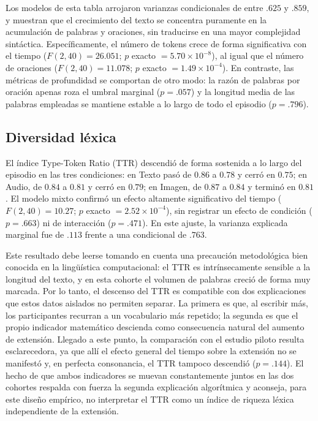 \documentclass[12pt]{article}
\begin{document}
	Los modelos de esta tabla arrojaron varianzas condicionales de entre $.625$ y $.859$, y muestran que el crecimiento del texto se concentra puramente en la acumulación de palabras y oraciones, sin traducirse en una mayor complejidad sintáctica. Específicamente, el número de tokens crece de forma significativa con el tiempo ($F(2,40) = 26.051$; $p$ exacto $= 5.70 \times 10^{-8}$), al igual que el número de oraciones ($F(2,40) = 11.078$; $p$ exacto $= 1.49 \times 10^{-4}$). En contraste, las métricas de profundidad se comportan de otro modo: la razón de palabras por oración apenas roza el umbral marginal ($p = .057$) y la longitud media de las palabras empleadas se mantiene estable a lo largo de todo el episodio ($p = .796$). 
	
	\subsection{Diversidad léxica} 
	
	El índice Type-Token Ratio (TTR) descendió de forma sostenida a lo largo del episodio en las tres condiciones: en Texto pasó de $0.86$ a $0.78$ y cerró en $0.75$; en Audio, de $0.84$ a $0.81$ y cerró en $0.79$; en Imagen, de $0.87$ a $0.84$ y terminó en $0.81$. El modelo mixto confirmó un efecto altamente significativo del tiempo ($F(2,40) = 10.27$; $p$ exacto $= 2.52 \times 10^{-4}$), sin registrar un efecto de condición ($p = .663$) ni de interacción ($p = .471$). En este ajuste, la varianza explicada marginal fue de $.113$ frente a una condicional de $.763$. 
	
	Este resultado debe leerse tomando en cuenta una precaución metodológica bien conocida en la lingüística computacional: el TTR es intrínsecamente sensible a la longitud del texto, y en esta cohorte el volumen de palabras creció de forma muy marcada. Por lo tanto, el descenso del TTR es compatible con dos explicaciones que estos datos aislados no permiten separar. La primera es que, al escribir más, los participantes recurran a un vocabulario más repetido; la segunda es que el propio indicador matemático descienda como consecuencia natural del aumento de extensión. Llegado a este punto, la comparación con el estudio piloto resulta esclarecedora, ya que allí el efecto general del tiempo sobre la extensión no se manifestó y, en perfecta consonancia, el TTR tampoco descendió ($p = .144$). El hecho de que ambos indicadores se muevan constantemente juntos en las dos cohortes respalda con fuerza la segunda explicación algorítmica y aconseja, para este diseño empírico, no interpretar el TTR como un índice de riqueza léxica independiente de la extensión.
	
\end{document}
